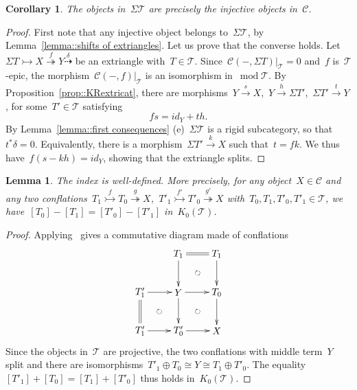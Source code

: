 \documentclass{amsart}
\newtheorem{corollary}[theorem]{Corollary}
\newtheorem{lemma}[theorem]{Lemma}
\theoremstyle{definition}
\newcommand{\cat}{\mathcal{C}}
\newcommand{\susp}{\Sigma}
\newcommand{\MOD}{\operatorname{mod}}
\newcommand{\tc}{\mathcal{T}}
\newcommand{\infl}{\rightarrowtail}
\newcommand{\defl}{\twoheadrightarrow}
\newcommand{\modt}{\MOD\tc}
\newcommand{\kzero}[1]{K_0(#1)}
\begin{document}
\begin{corollary}
The objects in~$\susp\tc$ are precisely the injective objects in~$\cat$.
\end{corollary}

\begin{proof}
First note that any injective object belongs to~$\susp \tc$, by Lemma~\ref{lemma::shifts of extriangles}.
Let us prove that the converse holds.
Let~$\susp T \infl X \overset{f}{\defl} Y\overset{\delta}{\dashrightarrow}$ be an extriangle with~$T\in\tc$.
Since~$\cat(-,\susp T)|_\tc = 0$ and~$f$ is~$\tc$-epic, the morphism~$\cat(-,f)|_\tc$ is an isomorphism in~$\modt$.
By Proposition~\ref{prop::KRextricat}, there are morphisms~$Y\overset{s}{\to} X$,~$Y\xrightarrow{h}\susp T'$,~$\susp T'\xrightarrow{t} Y$, for some~$T'\in\tc$ satisfying
\[
fs = id_Y + th.
\]
By Lemma~\ref{lemma::first consequences} (e)~$\susp\tc$ is a rigid subcategory, so that~$t^\ast\delta=0$.
Equivalently, there is a morphism~$\susp T'\xrightarrow{k} X$ such that~$t=fk$.
We thus have~$f(s-kh)=id_Y$, showing that the extriangle splits.
\end{proof}

\begin{lemma}\label{lemma::index well-defined extricat}
 The index is well-defined. More precisely, for any object~$X\in\cat$ and any two conflations~$T_1\overset{f}{\infl} T_0 \overset{g}{\defl} X$,~$T'_1\overset{f'}{\infl} T'_0 \overset{g'}{\defl} X$ with~$T_0,T_1,T'_0,T'_1\in\tc$, we have~$[T_0]-[T_1]=[T'_0]-[T'_1]$ in~$\kzero{\tc}$.
\end{lemma}

\begin{proof}
Applying~\cite[Proposition 3.15]{NakaokaPalu} gives a commutative diagram made of conflations
\[
\xy
%
(-7,21)*+{T_1}="-12";
(7,21)*+{T_1}="-14";
%
(-21,7)*+{T'_1}="0";
(-7,7)*+{Y}="2";
(7,7)*+{T_0}="4";
%
(-21,-7)*+{T'_1}="10";
(-7,-7)*+{T'_0}="12";
(7,-7)*+{X}="14";
%
{\ar@{=} "-12";"-14"};
%
{\ar "-12";"2"};
{\ar "-14";"4"};
%
{\ar "0";"2"};
{\ar "2";"4"};
%
{\ar@{=} "0";"10"};
{\ar "2";"12"};
{\ar "4";"14"};
%
{\ar "10";"12"};
{\ar "12";"14"};
%
{\ar@{}|\circlearrowright "-12";"4"};
{\ar@{}|\circlearrowright "0";"12"};
{\ar@{}|\circlearrowright "2";"14"};
\endxy
\]
Since the objects in~$\tc$ are projective, the two conflations with middle term~$Y$ split and there are isomorphisms~$T'_1\oplus T_0 \cong Y \cong T_1\oplus T'_0$.
The equality~$[T'_1]+[T_0]=[T_1]+[T'_0]$ thus holds in~$\kzero{\tc}$.
\end{proof}
\end{document}
